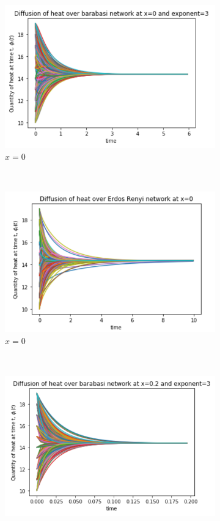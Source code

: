 \documentclass[10pt,a4paper]{article}
\begin{document}
     \begin{figure}[H]
     	\centering
     	\begin{subfigure}[b]{0.45\textwidth}
     		\includegraphics[width=\textwidth]{images/barabasi-x0.png}
     		\caption{$x=0$}
     		\label{barabasi-x0}
     	\end{subfigure}~
     	\begin{subfigure}[b]{0.45\textwidth}
     		\includegraphics[width= \textwidth]{images/erdos-x0.png}
     		\caption{$x=0$}
     		\label{erdos-x01}
     	\end{subfigure}\\
     	\begin{subfigure}[b]{0.45\textwidth}
     		\includegraphics[width= \textwidth]{images/barabasi-x02.png}

\end{subfigure}
\end{figure}
\end{document}
